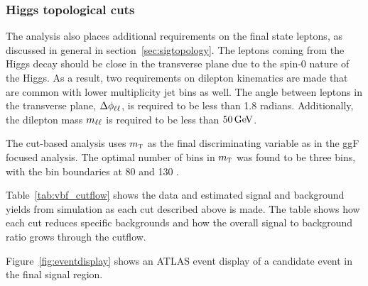 \subsubsection{Higgs topological cuts}

The analysis also places additional requirements on the final state leptons, as discussed in general in section~\ref{sec:sigtopology}. The leptons coming from the Higgs decay should be close in the transverse plane due to the spin-0 nature of the Higgs. As a result, two requirements on dilepton kinematics are made that are common with lower multiplicity jet bins as well. The angle between leptons in the transverse plane, $\Delta\phi_{\ell\ell}$, is required to be less than 1.8 radians. Additionally, the dilepton mass $m_{\ell\ell}$ is required to be less than $50 \GeV$. 

The cut-based analysis uses $m_{\textrm{\footnotesize\sc t}}$ as the final discriminating variable as in the ggF focused analysis. The optimal number of bins in $m_{\textrm{\footnotesize\sc t}}$ was found to be three bins, with the bin boundaries at 80 and 130 \GeV. 

Table~\ref{tab:vbf_cutflow} shows the data and estimated signal and background yields from simulation as each cut described above is made. The table shows how each cut reduces specific backgrounds and how the overall signal to background ratio grows through the cutflow. 

Figure~\ref{fig:eventdisplay} shows an ATLAS event display of a candidate event in the final signal region. 

